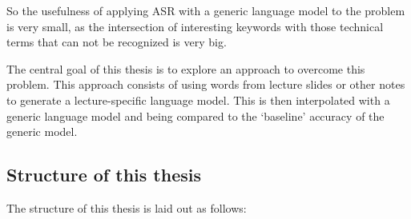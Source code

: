 \documentclass[]{article}
\begin{document}
So the usefulness of applying ASR with a generic language model to the
problem is very small, as the intersection of interesting keywords with
those technical terms that can not be recognized is very big.

The central goal of this thesis is to explore an approach to overcome
this problem. This approach consists of using words from lecture slides
or other notes to generate a lecture-specific language model. This is
then interpolated with a generic language model and being compared to
the `baseline' accuracy of the generic model.

\pagebreak

\subsection*{Structure of this thesis}\label{structure-of-this-thesis}

The structure of this thesis is laid out as follows:
\end{document}
